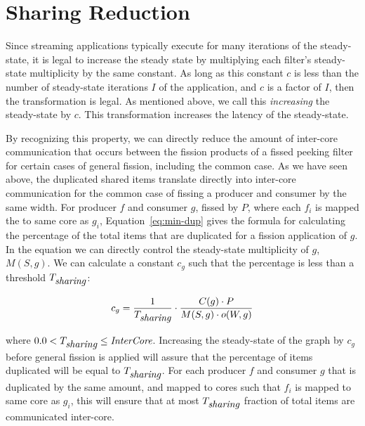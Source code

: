 \section{Sharing Reduction}

Since streaming applications typically execute for
many iterations of the steady-state, it is legal to increase the
steady state by multiplying each filter's steady-state multiplicity by
the same constant.  As long as this constant $c$ is less than the number
of steady-state iterations $I$ of the application, and $c$ is a factor of
$I$, then the transformation is legal.  As mentioned above, we call
this {\it increasing} the steady-state by $c$.  This transformation
increases the latency of the steady-state.

By recognizing this property, we can directly reduce the amount of
inter-core communication that occurs between the fission products of a
fissed peeking filter for certain cases of general fission, including
the common case.  As we have seen above, the duplicated shared items
translate directly into inter-core communication for the common case
of fissing a producer and consumer by the same width.  For producer
$f$ and consumer $g$, fissed by $P$, where each $f_i$ is mapped the to
same core as $g_i$, Equation~\ref{eq:min-dup} gives the formula for
calculating the percentage of the total items that are duplicated for
a fission application of $g$.  In the equation we can directly control
the steady-state multiplicity of $g$, $M(S,g)$.  We can calculate a
constant $c_g$ such that the percentage is less than a threshold
$T_{\mbox{\it sharing}}$:

\begin{equation}
\label{eq:ic-thresh}
c_g = \frac{1}{T_{\mt{sharing}}} \cdot \frac{C(g) \cdot P}{M(S,g) \cdot o(W,g)}
\end{equation}

\noindent where $0.0 < T_{\mbox{\it sharing}} \le \mbox{\it InterCore}$. Increasing the
steady-state of the graph by $c_g$ before general fission is applied
will assure that the percentage of items duplicated will be equal to
$T_{\mbox{\it sharing}}$.  For each producer $f$ and consumer $g$ that is
duplicated by the same amount, and mapped to cores such that $f_i$ is
mapped to same core as $g_i$, this will ensure that at most
$T_{\mbox{\it sharing}}$ fraction of total items are communicated inter-core.




